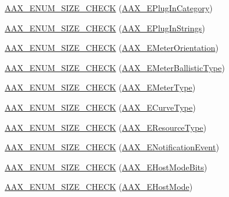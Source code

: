 \begin{DoxyCompactItemize}
\item 
\hyperlink{a00206_af03b09e4b8f907df552ebec1e370a135}{A\+A\+X\+\_\+\+E\+N\+U\+M\+\_\+\+S\+I\+Z\+E\+\_\+\+C\+H\+E\+C\+K} (\hyperlink{a00206_aef9637518fb1ac0e2f403444c73aba4a}{A\+A\+X\+\_\+\+E\+Plug\+In\+Category})
\item 
\hyperlink{a00206_a4b8945e01f3337265dcee5f454bc5857}{A\+A\+X\+\_\+\+E\+N\+U\+M\+\_\+\+S\+I\+Z\+E\+\_\+\+C\+H\+E\+C\+K} (\hyperlink{a00206_a86f7310877399d9d4d2ea4863d472476}{A\+A\+X\+\_\+\+E\+Plug\+In\+Strings})
\item 
\hyperlink{a00206_aa9225c8cfef25d0acf0926a642b5218e}{A\+A\+X\+\_\+\+E\+N\+U\+M\+\_\+\+S\+I\+Z\+E\+\_\+\+C\+H\+E\+C\+K} (\hyperlink{a00206_af260f0f9a6bff0f7bfd3200b2947c96b}{A\+A\+X\+\_\+\+E\+Meter\+Orientation})
\item 
\hyperlink{a00206_a53dfd5cc131b9b12740186bbbb732b7e}{A\+A\+X\+\_\+\+E\+N\+U\+M\+\_\+\+S\+I\+Z\+E\+\_\+\+C\+H\+E\+C\+K} (\hyperlink{a00206_a9aaedbe356691c4e4584fa7ccdbcc776}{A\+A\+X\+\_\+\+E\+Meter\+Ballistic\+Type})
\item 
\hyperlink{a00206_addacef5d33544a5cdbe9d58b63605545}{A\+A\+X\+\_\+\+E\+N\+U\+M\+\_\+\+S\+I\+Z\+E\+\_\+\+C\+H\+E\+C\+K} (\hyperlink{a00206_a590815545eaf0d3be0bb8f656fe2a761}{A\+A\+X\+\_\+\+E\+Meter\+Type})
\item 
\hyperlink{a00206_ab8ce307b2b85eb0d5de17813eda29077}{A\+A\+X\+\_\+\+E\+N\+U\+M\+\_\+\+S\+I\+Z\+E\+\_\+\+C\+H\+E\+C\+K} (\hyperlink{a00342_ga59c73d8f51c5c55d54a728eff39da884}{A\+A\+X\+\_\+\+E\+Curve\+Type})
\item 
\hyperlink{a00206_a04d4c1951e42ae74c94bb99454ac28fd}{A\+A\+X\+\_\+\+E\+N\+U\+M\+\_\+\+S\+I\+Z\+E\+\_\+\+C\+H\+E\+C\+K} (\hyperlink{a00206_ae2805e88175d975589153a04e42898bb}{A\+A\+X\+\_\+\+E\+Resource\+Type})
\item 
\hyperlink{a00206_ae90559e18b44edddec74b4595009c81b}{A\+A\+X\+\_\+\+E\+N\+U\+M\+\_\+\+S\+I\+Z\+E\+\_\+\+C\+H\+E\+C\+K} (\hyperlink{a00206_afab5ea2cfd731fc8f163b6caa685406e}{A\+A\+X\+\_\+\+E\+Notification\+Event})
\item 
\hyperlink{a00206_ac166b575bff4f47816a531a4b06fa3d2}{A\+A\+X\+\_\+\+E\+N\+U\+M\+\_\+\+S\+I\+Z\+E\+\_\+\+C\+H\+E\+C\+K} (\hyperlink{a00206_aa3c8056a6ce601cc3367cb7d4478e9da}{A\+A\+X\+\_\+\+E\+Host\+Mode\+Bits})
\item 
\hyperlink{a00206_a6b565d001b7c6478b5d1154446dc1397}{A\+A\+X\+\_\+\+E\+N\+U\+M\+\_\+\+S\+I\+Z\+E\+\_\+\+C\+H\+E\+C\+K} (\hyperlink{a00206_af7d77416967955e258539694870f395a}{A\+A\+X\+\_\+\+E\+Host\+Mode})
\item 

\end{DoxyCompactItemize}
